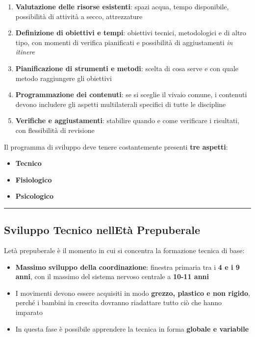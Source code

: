 \documentclass[a4paper,11pt]{article}
\providecommand{\tightlist}{%
  \setlength{\itemsep}{0pt}\setlength{\parskip}{0pt}}
\begin{document}
\begin{enumerate}
      \tightlist
      \item
            \textbf{Valutazione delle risorse esistenti}: spazi acqua, tempo
            disponibile, possibilità di attività a secco, attrezzature
      \item
            \textbf{Definizione di obiettivi e tempi}: obiettivi tecnici,
            metodologici e di altro tipo, con momenti di verifica pianificati e
            possibilità di aggiustamenti \emph{in itinere}
      \item
            \textbf{Pianificazione di strumenti e metodi}: scelta di cosa serve e
            con quale metodo raggiungere gli obiettivi
      \item
            \textbf{Programmazione dei contenuti}: se si sceglie il vivaio comune,
            i contenuti devono includere gli aspetti multilaterali specifici di
            tutte le discipline
      \item
            \textbf{Verifiche e aggiustamenti}: stabilire quando e come verificare
            i risultati, con flessibilità di revisione
\end{enumerate}

Il programma di sviluppo deve tenere costantemente presenti \textbf{tre
      aspetti}:

\begin{itemize}
      \tightlist
      \item
            \textbf{Tecnico}
      \item
            \textbf{Fisiologico}
      \item
            \textbf{Psicologico}
\end{itemize}

\begin{center}\rule{0.5\linewidth}{0.5pt}\end{center}

\subsection{Sviluppo Tecnico nell\textquotesingle Età
      Prepuberale}\label{sviluppo-tecnico-nelletuxe0-prepuberale}

L\textquotesingle età prepuberale è il momento in cui si concentra la
formazione tecnica di base:

\begin{itemize}
      \tightlist
      \item
            \textbf{Massimo sviluppo della coordinazione}: finestra primaria tra i
            \textbf{4 e i 9 anni}, con il massimo del sistema nervoso centrale a
            \textbf{10-11 anni}
      \item
            I movimenti devono essere acquisiti in modo \textbf{grezzo, plastico e
                  non rigido}, perché i bambini in crescita dovranno riadattare tutto
            ciò che hanno imparato
      \item
            In questa fase è possibile apprendere la tecnica in forma
            \textbf{globale e variabile}
\end{itemize}
\end{document}

